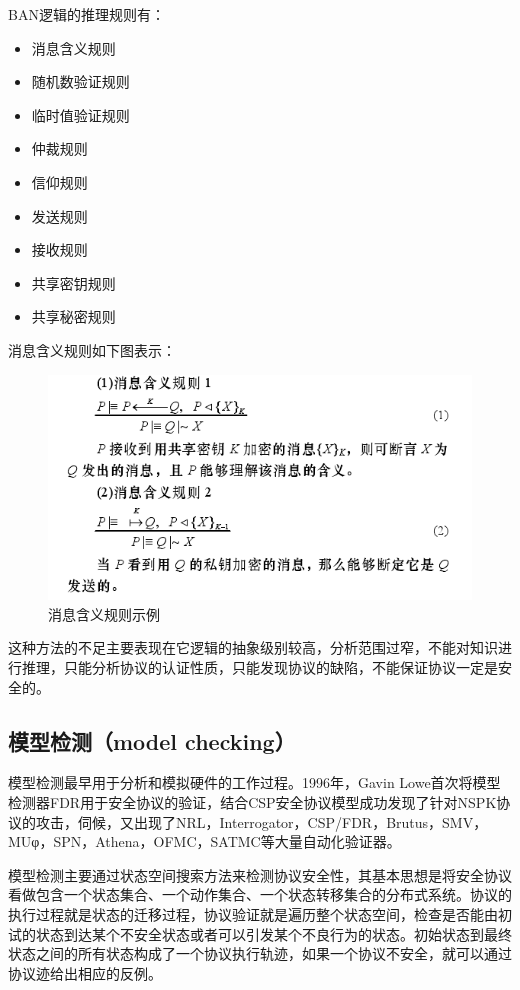 \documentclass[cs4size,a4pape,UTF8]{ctexart}
\numberwithin{equation}{section}
\numberwithin{table}{section}
\numberwithin{figure}{section}
\begin{document}
BAN逻辑的推理规则有：

\begin{itemize}
\item 消息含义规则
\item 随机数验证规则
\item 临时值验证规则
\item 仲裁规则
\item 信仰规则
\item 发送规则
\item 接收规则
\item 共享密钥规则
\item 共享秘密规则
\end{itemize}

消息含义规则如下图表示：

\begin{figure}[thbp!]
\centering
\includegraphics[width=0.6\linewidth]{figure/2}
\caption{消息含义规则示例}
\label{fig:2}
\end{figure}

这种方法的不足主要表现在它逻辑的抽象级别较高，分析范围过窄，不能对知识进行推理，只能分析协议的认证性质，只能发现协议的缺陷，不能保证协议一定是安全的。

\subsection{模型检测（model checking）}
模型检测最早用于分析和模拟硬件的工作过程。1996年，Gavin Lowe首次将模型检测器FDR用于安全协议的验证，结合CSP安全协议模型成功发现了针对NSPK协议的攻击，伺候，又出现了NRL，Interrogator，CSP/FDR，Brutus，SMV，MUφ，SPN，Athena，OFMC，SATMC等大量自动化验证器。

模型检测主要通过状态空间搜索方法来检测协议安全性，其基本思想是将安全协议看做包含一个状态集合、一个动作集合、一个状态转移集合的分布式系统。协议的执行过程就是状态的迁移过程，协议验证就是遍历整个状态空间，检查是否能由初试的状态到达某个不安全状态或者可以引发某个不良行为的状态。初始状态到最终状态之间的所有状态构成了一个协议执行轨迹，如果一个协议不安全，就可以通过协议迹给出相应的反例。
\end{document}
